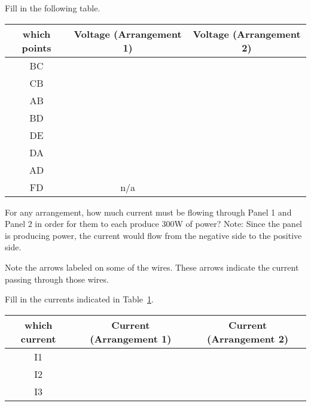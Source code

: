 \begin{blevel}
Fill in the following table.
\end{blevel}
\par
\begin{table}[H]
\begin{center}
\begin{tabular}{|c|c|c|}\hline
which points	& Voltage (Arrangement 1)&Voltage (Arrangement 2) \\ \hline
BC & & \\ \hline
CB & & \\ \hline
AB & & \\ \hline
BD & & \\ \hline
DE & & \\ \hline
DA & & \\ \hline
AD & & \\ \hline
FD & n/a & \\ \hline	
\end{tabular}
\end{center}
\end{table}

\begin{blevel}
For any arrangement, how much current must be flowing through Panel 1 and Panel 2 in order for them to each produce 300W of power? Note: Since the panel is producing power, the current would flow from the negative side to the positive side.
\end{blevel}

Note the arrows labeled on some of the wires. These arrows indicate the current passing through those wires.
\par
\begin{blevel}
Fill in the currents indicated in Table~\ref{T:2SSC}.
\end{blevel}

\par
\begin{table}[H]
\begin{center}
\begin{tabular}{|c|c|c|}\hline
which current	& Current (Arrangement 1)&Current (Arrangement 2) \\ \hline
I1 & & \\ \hline
I2 & & \\ \hline
I3 & & \\ \hline
\end{tabular}
\label{T:2SSC}
\end{center}
\end{table}

